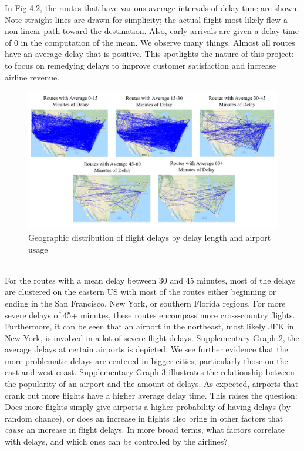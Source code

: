 \documentclass[12pt, a4paper, openany]{book}
\newcommand\tab[1][1cm]{\hspace*{#1}}
\begin{document}
			\tab In \underline{Fig 4.2}, the routes that have various average intervals of delay time are shown. Note straight lines are drawn for simplicity; the actual flight most likely flew a non-linear path toward the destination. Also, early arrivals are given a delay time of 0 in the computation of the mean. We observe many things. Almost all routes have an average delay that is positive. This spotlights the nature of this project: to focus on remedying delays to improve customer satisfaction and increase airline revenue. 
			\begin{figure}[h]
			\centering
	 		\includegraphics[width = .9 \textwidth]{../figures/PLOTS FOR REPORT/Chapter 4/Figure 4.21}
	 		\caption{Geographic distribution of flight delays by delay length and airport usage}
	 		\end{figure}\\
	 		\tab For the routes with a mean delay between 30 and 45 minutes, most of the delays are clustered on the eastern US with most of the routes either beginning or ending in the San Francisco, New York, or southern Florida regions. For more severe delays of 45+ minutes, these routes encompass more cross-country flights. Furthermore, it can be seen that an airport in the northeast, most likely JFK in New York, is involved in a lot of severe flight delays. \underline{Supplementary Graph 2}, the average delays at certain airports is depicted. We see further evidence that the more problematic delays are centered in bigger cities, particularly those on the east and west coast. \underline{Supplementary Graph 3} illustrates the relationship between the popularity of an airport and the amount of delays. As expected, airports that crank out more flights have a higher average delay time. This raises the question: Does more flights simply give airports a higher probability of having delays (by random chance), or does an increase in flights also bring in other factors that \textit{cause} an increase in flight delays. In more broad terms, what factors correlate with delays, and which ones can be controlled by the airlines?\\
\end{document}
